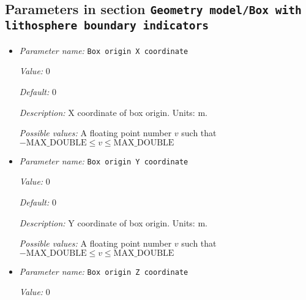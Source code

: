 \subsection{Parameters in section \tt Geometry model/Box with lithosphere boundary indicators}
\label{parameters:Geometry_20model/Box_20with_20lithosphere_20boundary_20indicators}

\begin{itemize}
\item {\it Parameter name:} {\tt Box origin X coordinate}
\label{parameters:Geometry model/Box with lithosphere boundary indicators/Box origin X coordinate}
\label{parameters:Geometry_20model/Box_20with_20lithosphere_20boundary_20indicators/Box_20origin_20X_20coordinate}


{\it Value:} 0


{\it Default:} 0


{\it Description:} X coordinate of box origin. Units: m.


{\it Possible values:} A floating point number $v$ such that $-\text{MAX\_DOUBLE} \leq v \leq \text{MAX\_DOUBLE}$
\item {\it Parameter name:} {\tt Box origin Y coordinate}
\label{parameters:Geometry model/Box with lithosphere boundary indicators/Box origin Y coordinate}
\label{parameters:Geometry_20model/Box_20with_20lithosphere_20boundary_20indicators/Box_20origin_20Y_20coordinate}


{\it Value:} 0


{\it Default:} 0


{\it Description:} Y coordinate of box origin. Units: m.


{\it Possible values:} A floating point number $v$ such that $-\text{MAX\_DOUBLE} \leq v \leq \text{MAX\_DOUBLE}$
\item {\it Parameter name:} {\tt Box origin Z coordinate}
\label{parameters:Geometry model/Box with lithosphere boundary indicators/Box origin Z coordinate}
\label{parameters:Geometry_20model/Box_20with_20lithosphere_20boundary_20indicators/Box_20origin_20Z_20coordinate}


{\it Value:} 0



\end{itemize}
